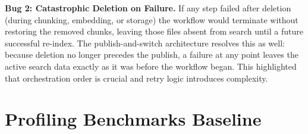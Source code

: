 \documentclass[a4paper,12pt]{article}
\begin{document}
\textbf{Bug 2: Catastrophic Deletion on Failure.} If any step failed after
deletion (during chunking, embedding, or storage) the workflow would terminate
without restoring the removed chunks, leaving those files absent from search until a
future successful re-index. The publish-and-switch architecture resolves this as
well: because deletion no longer precedes the publish, a failure at any point leaves
the active search data exactly as it was before the workflow began. This highlighted
that orchestration order is crucial and retry logic introduces complexity.

\newpage

\appendix
\section{Profiling Benchmarks Baseline}
\label{app:prof_baseline}
\end{document}
